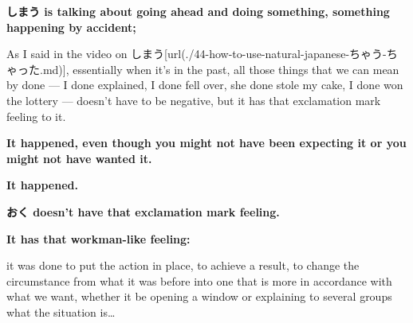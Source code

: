 \thinrule

{\bf しまう is talking about going ahead and\crlf
doing something, something happening by accident;}

As I said in the video on しまう\goto{{[}44{]}}[url(./44-how-to-use-natural-japanese-ちゃう-ちゃった.md)], essentially when it's in the past, all those things that we can mean by done --- I done explained, I done fell over, she done stole my cake, I done won the lottery --- doesn't have to be negative, but it has that exclamation mark feeling to it.

{\bf It happened, even though you might not have been expecting it or you might not have wanted it.}

{\bf It happened.}

\thinrule

{\bf おく doesn't have that exclamation mark feeling.}

{\bf It has that workman-like feeling:}

it was done to put the action in place, to achieve a result, to change the circumstance from what it was before into one that is more in accordance with what we want, whether it be opening a window or explaining to several groups what the situation is\ldots{}

\stopsectionlevel

